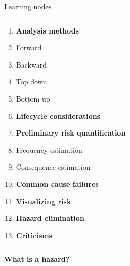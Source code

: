 \documentclass[aspectratio=1610,pdftex,dvipsnames,compress,xcolor={dvipsnames}]{beamer}
\begin{document}
\begin{frame}{Learning nodes}
\begin{columns}[t]
        \begin{column}{0.50\textwidth}
            \begin{enumerate}[series=outerlist,topsep=0pt,itemsep=1pt,leftmargin=*,label=(\arabic*)]
                \item[]\hfill\textbf{Analysis methods}
                \item[]\hfill Forward
                \item[]\hfill Backward
                \item[]\hfill Top down
                \item[]\hfill Bottom up
                    \vspace{0.10in}
                \item[]\hfill\textbf{Lifecycle considerations}
                    \vspace{0.10in}
                \item[]\hfill\textbf{Preliminary risk quantification}
                \item[]\hfill Frequency estimation
                \item[]\hfill Consequence estimation
                    \vspace{0.10in}
                \item[]\hfill\textbf{Common cause failures}
                    \vspace{0.05in}
                \item[]\hfill\textbf{Visualizing risk}
                    \vspace{0.05in}
                \item[]\hfill\textbf{Hazard elimination}
                    \vspace{0.05in}
                \item[]\hfill\textbf{Criticisms}
            \end{enumerate}
        \end{column}

    \end{columns}
\end{frame}


\begin{frame}[plain]{}
    \centering\LARGE\textbf{What is a hazard?}
\end{frame}
\end{document}
